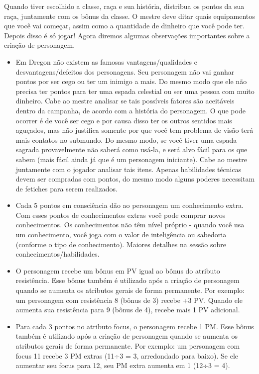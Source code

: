 Quando tiver escolhido a classe, raça e sua história, distribua os pontos da sua raça, juntamente com os bônus da classe. O mestre deve ditar quais equipamentos que você vai começar, assim como a quantidade de dinheiro que você pode ter. Depois disso é só jogar!
Agora diremos algumas observações importantes sobre a criação de personagem.


\begin{itemize}
	\item Em Dregon não existem as famosas vantagens/qualidades e desvantagens/defeitos dos personagens. Seu personagem não vai ganhar pontos por ser cego ou ter um inimigo a mais. Do mesmo modo que ele não precisa ter pontos para ter uma espada celestial ou ser uma pessoa com muito dinheiro. Cabe ao mestre analisar se tais possíveis fatores são aceitáveis dentro da campanha, de acordo com a história do personagem.
O que pode ocorrer é de você ser cego e por causa disso ter os outros sentidos mais aguçados, mas não justifica somente por que você tem problema de visão terá mais contatos no submundo. Do mesmo modo, se você tiver uma espada sagrada provavelmente não saberá como usá-la, e será alvo fácil para os que sabem (mais fácil ainda já que é um personagem iniciante). Cabe ao mestre juntamente com o jogador analisar tais itens. Apenas habilidades técnicas devem ser compradas com pontos, do mesmo modo alguns poderes necessitam de fetiches para serem realizados.
	\item Cada 5 pontos em consciência dão ao personagem um conhecimento extra. Com esses pontos de conhecimentos extras você pode comprar novos conhecimentos. Os conhecimentos não têm nível próprio - quando você usa um conhecimento, você joga com o valor de inteligência ou sabedoria (conforme o tipo de conhecimento). Maiores detalhes na sessão sobre conhecimentos/habilidades.
 	\item O personagem recebe um bônus em PV igual ao bônus do atributo resistência. Esse bônus também é utilizado após a criação de personagem quando se aumenta os atributos gerais de forma permanente. Por exemplo: um personagem com resistência 8 (bônus de 3) recebe +3 PV. Quando ele aumenta sua resistência para 9 (bônus de 4), recebe mais 1 PV adicional.
	\item Para cada 3 pontos no atributo focus, o personagem recebe 1 PM. Esse bônus também é utilizado após a criação de personagem quando se aumenta os atributos gerais de forma permanente. Por exemplo: um personagem com focus 11 recebe 3 PM extras (11÷3 = 3, arredondado para baixo). Se ele aumentar seu focus para 12, seu PM extra aumenta em 1 (12÷3 = 4).

\end{itemize}
